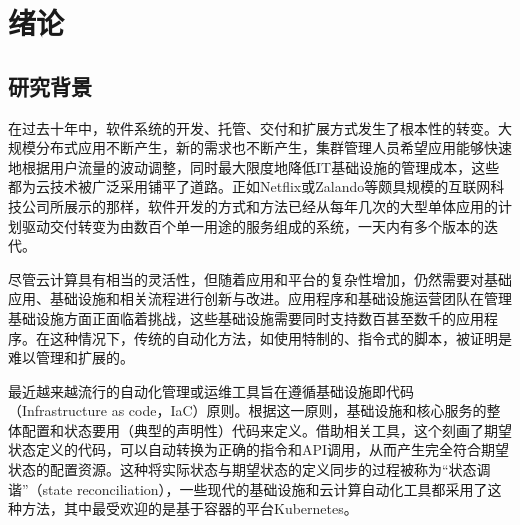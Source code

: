 \documentclass[macfonts,master]{njuthesis}
\begin{document}
\tableofcontents

\listoffigures

\listoftables

\mainmatter

\chapter{绪论}\label{chapter_introduction}
\section{研究背景}

在过去十年中，软件系统的开发、托管、交付和扩展方式发生了根本性的转变。大规模分布式应用不断产生，新的需求也不断产生，集群管理人员希望应用能够快速地根据用户流量的波动调整，同时最大限度地降低IT基础设施的管理成本，这些都为云技术被广泛采用铺平了道路。正如Netflix或Zalando等颇具规模的互联网科技公司所展示的那样，软件开发的方式和方法已经从每年几次的大型单体应用的计划驱动交付转变为由数百个单一用途的服务组成的系统，一天内有多个版本的迭代\cite{zalando}\cite{netflix}。

尽管云计算具有相当的灵活性，但随着应用和平台的复杂性增加，仍然需要对基础应用、基础设施和相关流程进行创新与改进。应用程序和基础设施运营团队在管理基础设施方面正面临着挑战，这些基础设施需要同时支持数百甚至数千的应用程序。在这种情况下，传统的自动化方法，如使用特制的、指令式的脚本，被证明是难以管理和扩展的。

最近越来越流行的自动化管理或运维工具旨在遵循基础设施即代码（Infrastructure as code，IaC）原则。根据这一原则，基础设施和核心服务的整体配置和状态要用（典型的声明性）代码来定义。借助相关工具，这个刻画了期望状态定义的代码，可以自动转换为正确的指令和API调用，从而产生完全符合期望状态的配置资源。这种将实际状态与期望状态的定义同步的过程被称为``状态调谐''（state reconciliation），一些现代的基础设施和云计算自动化工具都采用了这种方法，其中最受欢迎的是基于容器的平台Kubernetes。
\end{document}
